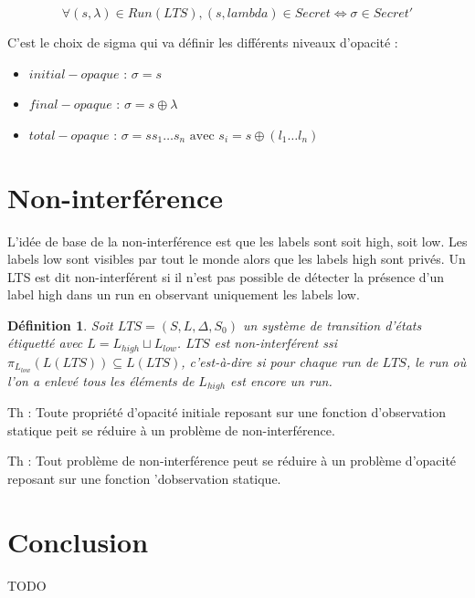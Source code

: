\documentclass[10pt,a4paper]{article}
\newtheorem {mydef} {D\'efinition}
\begin{document}
$$\forall (s,\lambda) \in Run(LTS), (s,lambda) \in Secret \Leftrightarrow \sigma \in Secret'$$

C'est le choix de sigma qui va d\'efinir les diff\'erents niveaux d'opacit\'e :

\begin{itemize}
	\item $initial-opaque$ : $\sigma = s$
	\item $final-opaque$ : $\sigma = s\oplus \lambda$
	\item $total-opaque$ : $\sigma = s s_1 \dots s_n \mbox{ avec } s_i = s\oplus(l_1\dots l_n)$
\end{itemize} 

\section{Non-interf\'erence}

L'id\'ee de base de la non-interf\'erence est que les labels sont soit high, soit low. Les labels low sont visibles par tout le monde alors que les labels high sont priv\'es. Un LTS est dit non-interf\'erent si il n'est pas possible de d\'etecter la pr\'esence d'un label high dans un run en observant uniquement les labels low.

\begin{mydef}
  Soit $LTS = (S,L,\Delta,S_0)$ un syst\`eme de transition d'\'etats \'etiquett\'e avec $L=L_{high}\sqcup L_{low}$. $LTS$ est non-interf\'erent ssi $\pi_{L_{low}}(L(LTS)) \subseteq L(LTS)$, c'est-\`a-dire si pour chaque run de $LTS$, le run o\`u l'on a enlev\'e tous les \'el\'ements de $L_{high}$ est encore un run.
\end{mydef}

Th : Toute propri\'et\'e d'opacit\'e initiale reposant sur une fonction d'observation statique peit se r\'eduire \`a un probl\`eme  de non-interf\'erence.

Th : Tout probl\`eme de non-interf\'erence peut se r\'eduire \`a un probl\`eme d'opacit\'e reposant sur une fonction 'dobservation statique.

\section{Conclusion}

TODO
\end{document}
